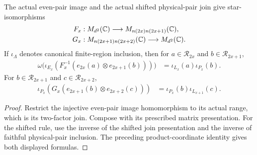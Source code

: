 \begin{lemma}
    \label{lem:qca_margolus_matrix_rules}
    \leanok
    The actual even-pair image and the actual shifted physical-pair join
    give star-isomorphisms
    \begin{align}
        F_x & : M_{d^2}(\mathbb C)\longrightarrow
        M_{n(2x)n(2x+1)}(\mathbb C),\notag                   \\
        G_x & : M_{n(2x+1)n(2x+2)}(\mathbb C)\longrightarrow
        M_{d^2}(\mathbb C).
    \end{align}
    If $\iota_\Lambda$ denotes canonical finite-region inclusion, then
    for $a\in\mathcal R_{2x}$ and $b\in\mathcal R_{2x+1}$,
    \begin{align}
        \omega\bigl(\iota_{E_x}(F_x^{-1}(e_{2x}(a)\otimes e_{2x+1}(b)))\bigr)
         & =\iota_{L_x}(a)\iota_{P_x}(b).
    \end{align}
    For $b\in\mathcal R_{2x+1}$ and $c\in\mathcal R_{2x+2}$,
    \begin{align}
        \iota_{P_x}(G_x(e_{2x+1}(b)\otimes e_{2x+2}(c)))
         & =\iota_{P_x}(b)\iota_{L_{x+1}}(c).
    \end{align}
\end{lemma}
\begin{proof}
    \leanok
    Restrict the injective even-pair image homomorphism to its actual
    range, which is its two-factor join. Compose with its prescribed
    matrix presentation. For the shifted rule, use the inverse of the
    shifted join presentation and the inverse of faithful physical-pair
    inclusion. The preceding product-coordinate identity gives both
    displayed formulas.
\end{proof}


